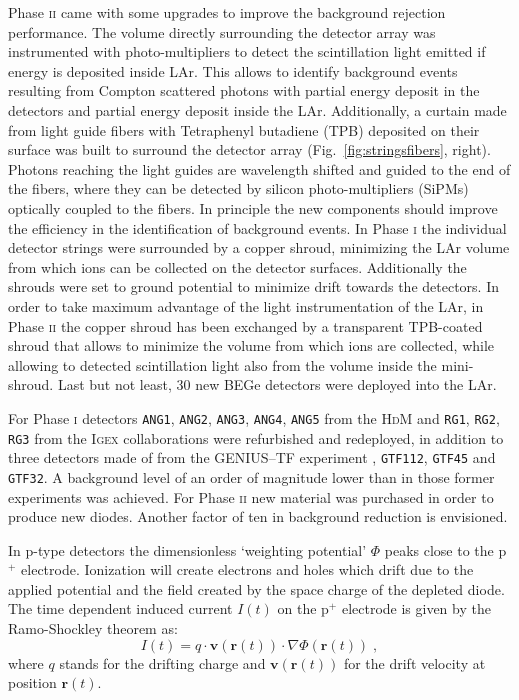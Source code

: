 Phase \textsc{ii} came with some upgrades to improve the background rejection performance. The volume directly surrounding the detector array was instrumented with photo-multipliers to detect the scintillation light emitted if energy is deposited inside LAr. This allows to identify background events resulting from Compton scattered photons with partial energy deposit in the detectors and partial energy deposit inside the LAr. Additionally, a curtain made from light guide fibers with Tetraphenyl butadiene (TPB) deposited on their surface was built to surround the detector array (Fig.~\ref{fig:stringsfibers}, right). Photons reaching the light guides are wavelength shifted and guided to the end of the fibers, where they can be detected by silicon photo-multipliers (SiPMs) optically coupled to the fibers. In principle the new components should improve the efficiency in the identification of background events. In Phase \textsc{i} the individual detector strings were surrounded by a copper shroud, minimizing the LAr volume from which  ions can be collected on the detector surfaces. Additionally the shrouds were set to ground potential to minimize drift towards the detectors. In order to take maximum advantage of the light instrumentation of the LAr, in Phase \textsc{ii} the copper shroud has been exchanged by a transparent TPB-coated shroud that allows to minimize the volume from which  ions are collected, while allowing to detected scintillation light also from the volume inside the mini-shroud. Last but not least, 30 new BEGe detectors were deployed into the LAr.

 For Phase \textsc{i} detectors \texttt{ANG1}, \texttt{ANG2}, \texttt{ANG3}, \texttt{ANG4}, \texttt{ANG5} from the \textsc{HdM} \cite{hdm} and \texttt{RG1}, \texttt{RG2}, \texttt{RG3} from the \textsc{Igex} \cite{igex} collaborations were refurbished and redeployed, in addition to three detectors made of  from the GENIUS--TF experiment \cite{genius1, genius2}, \texttt{GTF112}, \texttt{GTF45} and \texttt{GTF32}. A background level of an order of magnitude lower than in those former experiments was achieved. For Phase \textsc{ii} new material was purchased in order to produce new diodes. Another factor of ten in background reduction is envisioned.

In p-type detectors the dimensionless `weighting potential' $\Phi$ peaks close to the p$^+$ electrode. Ionization will create electrons and holes which drift due to the applied potential and the field created by the space charge of the depleted diode. The time dependent induced current $I(t)$ on the p$^+$ electrode is given by the Ramo-Shockley theorem \cite{schockley-ramo} as:
\begin{equation}I(t)=q\cdot\mathbf{v}(\mathbf{r}(t))\cdot\nabla\Phi(\mathbf{r}(t))\;,\end{equation}
where $q$ stands for the drifting charge and $\mathbf{v}(\mathbf{r}(t))$ for the drift velocity at position $\mathbf{r}(t)$.

